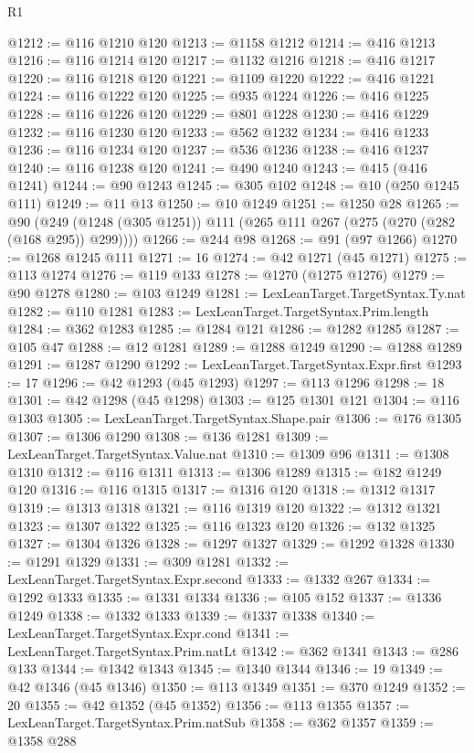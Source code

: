 \begin{lexlean}{R1}
\begin{coremodule}
@1212 := @116 @1210 @120
@1213 := @1158 @1212
@1214 := @416 @1213
@1216 := @116 @1214 @120
@1217 := @1132 @1216
@1218 := @416 @1217
@1220 := @116 @1218 @120
@1221 := @1109 @1220
@1222 := @416 @1221
@1224 := @116 @1222 @120
@1225 := @935 @1224
@1226 := @416 @1225
@1228 := @116 @1226 @120
@1229 := @801 @1228
@1230 := @416 @1229
@1232 := @116 @1230 @120
@1233 := @562 @1232
@1234 := @416 @1233
@1236 := @116 @1234 @120
@1237 := @536 @1236
@1238 := @416 @1237
@1240 := @116 @1238 @120
@1241 := @490 @1240
@1243 := @415 (@416 @1241)
@1244 := @90 @1243
@1245 := @305 @102
@1248 := @10 (@250 @1245 @111)
@1249 := @11 @13
@1250 := @10 @1249
@1251 := @1250 @28
@1265 := @90 (@249 (@1248 (@305 @1251)) @111 (@265 @111 @267 (@275 (@270 (@282 (@168 @295)) @299))))
@1266 := @244 @98
@1268 := @91 (@97 @1266)
@1270 := @1268 @1245 @111
@1271 := 16
@1274 := @42 @1271 (@45 @1271)
@1275 := @113 @1274
@1276 := @119 @133
@1278 := @1270 (@1275 @1276)
@1279 := @90 @1278
@1280 := @103 @1249
@1281 := LexLeanTarget.TargetSyntax.Ty.nat
@1282 := @110 @1281
@1283 := LexLeanTarget.TargetSyntax.Prim.length
@1284 := @362 @1283
@1285 := @1284 @121
@1286 := @1282 @1285
@1287 := @105 @47
@1288 := @12 @1281
@1289 := @1288 @1249
@1290 := @1288 @1289
@1291 := @1287 @1290
@1292 := LexLeanTarget.TargetSyntax.Expr.first
@1293 := 17
@1296 := @42 @1293 (@45 @1293)
@1297 := @113 @1296
@1298 := 18
@1301 := @42 @1298 (@45 @1298)
@1303 := @125 @1301 @121
@1304 := @116 @1303
@1305 := LexLeanTarget.TargetSyntax.Shape.pair
@1306 := @176 @1305
@1307 := @1306 @1290
@1308 := @136 @1281
@1309 := LexLeanTarget.TargetSyntax.Value.nat
@1310 := @1309 @96
@1311 := @1308 @1310
@1312 := @116 @1311
@1313 := @1306 @1289
@1315 := @182 @1249 @120
@1316 := @116 @1315
@1317 := @1316 @120
@1318 := @1312 @1317
@1319 := @1313 @1318
@1321 := @116 @1319 @120
@1322 := @1312 @1321
@1323 := @1307 @1322
@1325 := @116 @1323 @120
@1326 := @132 @1325
@1327 := @1304 @1326
@1328 := @1297 @1327
@1329 := @1292 @1328
@1330 := @1291 @1329
@1331 := @309 @1281
@1332 := LexLeanTarget.TargetSyntax.Expr.second
@1333 := @1332 @267
@1334 := @1292 @1333
@1335 := @1331 @1334
@1336 := @105 @152
@1337 := @1336 @1249
@1338 := @1332 @1333
@1339 := @1337 @1338
@1340 := LexLeanTarget.TargetSyntax.Expr.cond
@1341 := LexLeanTarget.TargetSyntax.Prim.natLt
@1342 := @362 @1341
@1343 := @286 @133
@1344 := @1342 @1343
@1345 := @1340 @1344
@1346 := 19
@1349 := @42 @1346 (@45 @1346)
@1350 := @113 @1349
@1351 := @370 @1249
@1352 := 20
@1355 := @42 @1352 (@45 @1352)
@1356 := @113 @1355
@1357 := LexLeanTarget.TargetSyntax.Prim.natSub
@1358 := @362 @1357
@1359 := @1358 @288

\end{coremodule}
\end{lexlean}
